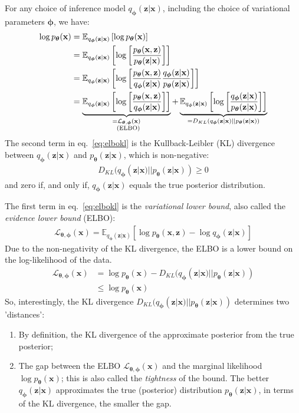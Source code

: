 \documentclass[MAL,biber]{nowfnt} %
\newcommand{\bb}[1]{\mathbf{#1}}
\newcommand{\bx}{\bb{x}}
\newcommand{\bz}{\bb{z}}
\newcommand{\bT}{\boldsymbol{\theta}}
\newcommand{\bphi}{\boldsymbol{\phi}}
\newcommand{\pT}{p_{\bT}}
\newcommand{\qP}{q_{\bphi}}
\newcommand{\Exp}[2]{\mathbb{E}_{#1}\left[#2\right]}
\newcommand{\ELBO}{\mathcal{L}_{\bT,\bphi}}
\begin{document}
For any choice of inference model $\qP(\bz|\bx)$, including the choice of variational parameters $\bphi$, we have:
\begin{align}
\log \pT(\bx)
&= \Exp{\qP(\bz|\bx)}{ \log \pT(\bx) }\\
&= \Exp{\qP(\bz|\bx)}{ \log \left[ \frac{\pT(\bx,\bz)}{\pT(\bz|\bx)} \right] } \\
&= \Exp{\qP(\bz|\bx)}{ \log \left[ \frac{\pT(\bx,\bz)}{\qP(\bz|\bx)} \frac{\qP(\bz|\bx)}{\pT(\bz|\bx)} \right] } \\
&= \underbrace{
	\Exp{\qP(\bz|\bx)}{ \log \left[ \frac{\pT(\bx,\bz)}{\qP(\bz|\bx)} \right] }
}_{\substack{= \ELBO(\bx) \\ \text{\;\;(ELBO)}}}
+ \underbrace{\Exp{\qP(\bz|\bx)}{ \log \left[ \frac{\qP(\bz|\bx)}{\pT(\bz|\bx)} \right] }
}_{= D_{KL}(\qP(\bz|\bx)||\pT(\bz|\bx))}
\label{eq:elbokl}
\end{align}
The second term in eq.~\eqref{eq:elbokl} is the Kullback-Leibler (KL) divergence between $\qP(\bz|\bx)$ and $\pT(\bz|\bx)$, which is non-negative:
\begin{align}
D_{KL}(\qP(\bz|\bx)||\pT(\bz|\bx)) \geq 0
\end{align}
and zero if, and only if, $\qP(\bz|\bx)$ equals the true posterior distribution.

The first term in eq.~\eqref{eq:elbokl} is the \emph{variational lower bound}, also called the \emph{evidence lower bound} (ELBO):
\begin{align}
\ELBO(\bx) = \Exp{\qP(\bz|\bx)}{ \log \pT(\bx,\bz) - \log \qP(\bz|\bx) }
\label{eq:elbo}
\end{align}
Due to the non-negativity of the KL divergence, the ELBO is a lower bound on the log-likelihood of the data.
\begin{align}
\ELBO(\bx)
&= \log \pT(\bx) - D_{KL}(\qP(\bz|\bx)||\pT(\bz|\bx)) \label{eq:elbo2}\\
&\leq \log \pT(\bx)
\end{align}
So, interestingly, the KL divergence $D_{KL}(\qP(\bz|\bx)||\pT(\bz|\bx))$ determines two 'distances': 
\begin{enumerate}
	\item By definition, the KL divergence of the approximate posterior from the true posterior;
	\item The gap between the ELBO $\ELBO(\bx)$ and the marginal likelihood $\log \pT(\bx)$; this is also called the \emph{tightness} of the bound. The better $\qP(\bz|\bx)$ approximates the true (posterior) distribution $\pT(\bz|\bx)$, in terms of the KL divergence, the smaller the gap.
\end{enumerate}
\end{document}
